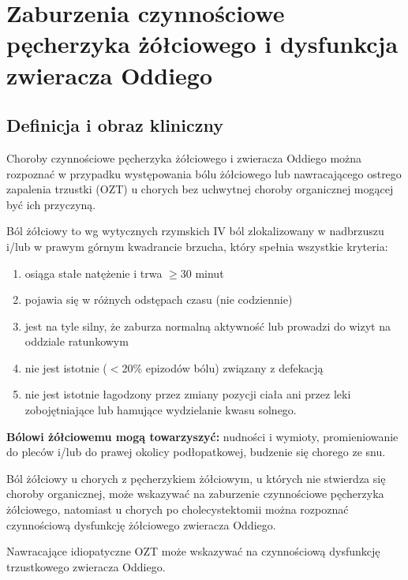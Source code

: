 
\chapter{Zaburzenia czynnościowe pęcherzyka żółciowego i dysfunkcja zwieracza Oddiego}

\section{Definicja i obraz kliniczny}

Choroby czynnościowe pęcherzyka żółciowego i zwieracza Oddiego można rozpoznać w przypadku występowania bólu żółciowego lub nawracającego ostrego zapalenia trzustki (OZT) u chorych bez uchwytnej choroby organicznej mogącej być ich przyczyną.

Ból żółciowy to wg wytycznych rzymskich IV ból zlokalizowany w nadbrzuszu i/lub w prawym górnym kwadrancie brzucha, który spełnia wszystkie kryteria:

\begin{enumerate}
    \item osiąga stałe natężenie i trwa $\geq$30 minut

    \item pojawia się w różnych odstępach czasu (nie codziennie)

    \item jest na tyle silny, że zaburza normalną aktywność lub prowadzi do wizyt na oddziale ratunkowym

    \item nie jest istotnie ($<$20\% epizodów bólu) związany z defekacją

    \item nie jest istotnie łagodzony przez zmiany pozycji ciała ani przez leki zobojętniające lub hamujące wydzielanie kwasu solnego.
\end{enumerate}

\textbf{Bólowi żółciowemu mogą towarzyszyć:} nudności i wymioty, promieniowanie do pleców i/lub do prawej okolicy podłopatkowej, budzenie się chorego ze snu.

Ból żółciowy u chorych z pęcherzykiem żółciowym, u których nie stwierdza się choroby organicznej, może wskazywać na zaburzenie czynnościowe pęcherzyka żółciowego, natomiast u chorych po cholecystektomii można rozpoznać czynnościową dysfunkcję żółciowego zwieracza Oddiego.

Nawracające idiopatyczne OZT może wskazywać na czynnościową dysfunkcję trzustkowego zwieracza Oddiego.

